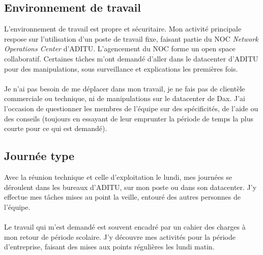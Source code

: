 \subsection{Environnement de travail}

L'environnement de travail est propre et sécuritaire. Mon activité principale respose sur l'utilisation d'un poste de travail fixe, faisant partie du NOC \textit{Network Operations Center} d'ADITU. L'agencement du NOC forme un open space collaboratif. Certaines tâches m'ont demandé d'aller dans le datacenter d'ADITU pour des manipulations, sous surveillance et explications les premières fois.
\\ \\
Je n'ai pas besoin de me déplacer dans mon travail, je ne fais pas de clientèle commerciale ou technique, ni de manipulations sur le datacenter de Dax. J'ai l'occasion de questionner les membres de l'équipe sur des spécificités, de l'aide ou des conseils (toujours en essayant de leur emprunter la période de temps la plus courte pour ce qui est demandé).

\subsection{Journée type}

Avec la réunion technique et celle d'exploitation le lundi, mes journées se déroulent dans les bureaux d'ADITU, sur mon poste ou dans son datacenter. J'y effectue mes tâches mises au point la veille, entouré des autres personnes de l'équipe.
\\ \\
Le travail qui m'est demandé est souvent encadré par un cahier des charges à mon retour de période scolaire. J'y découvre mes activités pour la période d'entreprise, faisant des mises aux points régulières les lundi matin.